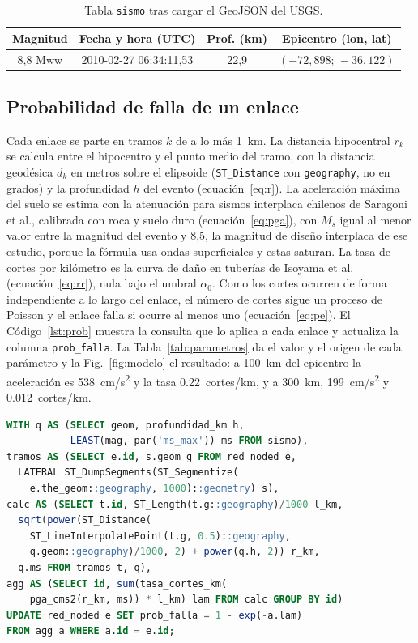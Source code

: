 \documentclass[conference]{IEEEtran}
\begin{document}
\begin{table}[t]
\centering
\caption{Tabla \texttt{sismo} tras cargar el GeoJSON del USGS.}
\label{tab:sismo}
\footnotesize
\begin{tabular}{@{}cccc@{}}
\toprule
Magnitud & Fecha y hora (UTC) & Prof. (km) & Epicentro (lon, lat) \\
\midrule
8,8 Mww & 2010-02-27 06:34:11,53 & 22,9 & $(-72{,}898;\,-36{,}122)$ \\
\bottomrule
\end{tabular}
\end{table}

\subsection{Probabilidad de falla de un enlace}
Cada enlace se parte en tramos $k$ de a lo más \SI{1}{km}.
La distancia hipocentral $r_k$ se calcula entre el hipocentro y el punto medio del tramo, con la distancia geodésica $d_k$ en metros sobre el elipsoide (\texttt{ST\_Distance} con \texttt{geography}, no en grados) y la profundidad $h$ del evento (ecuación~\eqref{eq:r}).
La aceleración máxima del suelo se estima con la atenuación para sismos interplaca chilenos de Saragoni et al., calibrada con roca y suelo duro \cite{saragoni2004} (ecuación~\eqref{eq:pga}), con $M_s$ igual al menor valor entre la magnitud del evento y 8,5, la magnitud de diseño interplaca de ese estudio, porque la fórmula usa ondas superficiales y estas saturan.
La tasa de cortes por kilómetro es la curva de daño en tuberías de Isoyama et al. \cite{isoyama2000} (ecuación~\eqref{eq:rr}), nula bajo el umbral $\alpha_0$.
Como los cortes ocurren de forma independiente a lo largo del enlace, el número de cortes sigue un proceso de Poisson y el enlace falla si ocurre al menos uno (ecuación~\eqref{eq:pe}).
El Código~\ref{lst:prob} muestra la consulta que lo aplica a cada enlace y actualiza la columna \texttt{prob\_falla}.
La Tabla~\ref{tab:parametros} da el valor y el origen de cada parámetro y la Fig.~\ref{fig:modelo} el resultado: a \SI{100}{km} del epicentro la aceleración es \SI{538}{cm/s^2} y la tasa \SI{0,22}{cortes/km}, y a \SI{300}{km}, \SI{199}{cm/s^2} y \SI{0,012}{cortes/km}.
\begin{lstlisting}[float=t,language=SQL,caption={Probabilidad de falla por enlace (extracto simplificado de \texttt{sql/05\_probabilidades.sql}); las distancias se calculan en metros con \texttt{geography}.},label={lst:prob}]
WITH q AS (SELECT geom, profundidad_km h,
           LEAST(mag, par('ms_max')) ms FROM sismo),
tramos AS (SELECT e.id, s.geom g FROM red_noded e,
  LATERAL ST_DumpSegments(ST_Segmentize(
    e.the_geom::geography, 1000)::geometry) s),
calc AS (SELECT t.id, ST_Length(t.g::geography)/1000 l_km,
  sqrt(power(ST_Distance(
    ST_LineInterpolatePoint(t.g, 0.5)::geography,
    q.geom::geography)/1000, 2) + power(q.h, 2)) r_km,
  q.ms FROM tramos t, q),
agg AS (SELECT id, sum(tasa_cortes_km(
    pga_cms2(r_km, ms)) * l_km) lam FROM calc GROUP BY id)
UPDATE red_noded e SET prob_falla = 1 - exp(-a.lam)
FROM agg a WHERE a.id = e.id;
\end{lstlisting}
\end{document}
